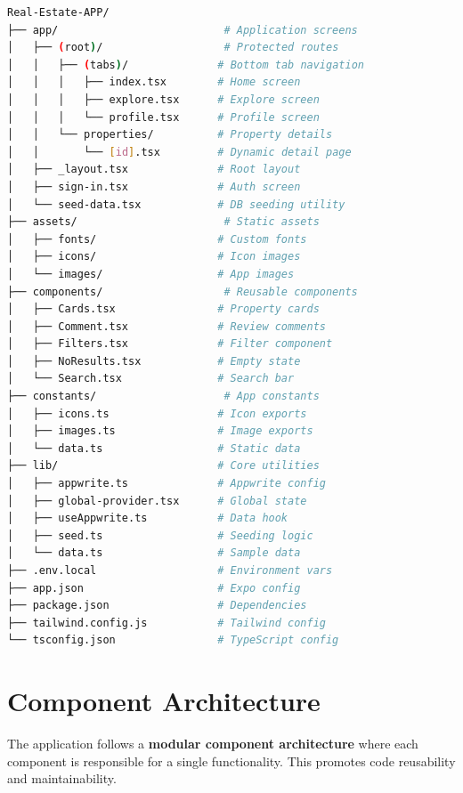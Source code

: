 \documentclass[11pt,a4paper,oneside]{book}
\begin{document}
\begin{lstlisting}[language=bash, caption=Project Directory Structure]
Real-Estate-APP/
├── app/                          # Application screens
│   ├── (root)/                   # Protected routes
│   │   ├── (tabs)/              # Bottom tab navigation
│   │   │   ├── index.tsx        # Home screen
│   │   │   ├── explore.tsx      # Explore screen
│   │   │   └── profile.tsx      # Profile screen
│   │   └── properties/          # Property details
│   │       └── [id].tsx         # Dynamic detail page
│   ├── _layout.tsx              # Root layout
│   ├── sign-in.tsx              # Auth screen
│   └── seed-data.tsx            # DB seeding utility
├── assets/                       # Static assets
│   ├── fonts/                   # Custom fonts
│   ├── icons/                   # Icon images
│   └── images/                  # App images
├── components/                   # Reusable components
│   ├── Cards.tsx                # Property cards
│   ├── Comment.tsx              # Review comments
│   ├── Filters.tsx              # Filter component
│   ├── NoResults.tsx            # Empty state
│   └── Search.tsx               # Search bar
├── constants/                    # App constants
│   ├── icons.ts                 # Icon exports
│   ├── images.ts                # Image exports
│   └── data.ts                  # Static data
├── lib/                         # Core utilities
│   ├── appwrite.ts              # Appwrite config
│   ├── global-provider.tsx      # Global state
│   ├── useAppwrite.ts           # Data hook
│   ├── seed.ts                  # Seeding logic
│   └── data.ts                  # Sample data
├── .env.local                   # Environment vars
├── app.json                     # Expo config
├── package.json                 # Dependencies
├── tailwind.config.js           # Tailwind config
└── tsconfig.json                # TypeScript config
\end{lstlisting}

\section{Component Architecture}

\begin{keypoint}
The application follows a \textbf{modular component architecture} where each component is responsible for a single functionality. This promotes code reusability and maintainability.
\end{keypoint}

\end{document}
